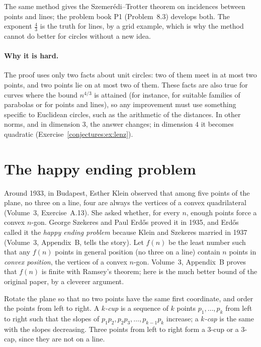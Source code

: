 The same method gives the Szemer\'edi--Trotter theorem on incidences between points and lines; the problem book P1 (Problem~8.3) develops both. The
exponent $\frac43$ is the truth for lines, by a grid example, which is why the method cannot do better for circles without a new idea.

\paragraph{Why it is hard.} The proof uses only two facts about unit circles: two of them meet in at most two points, and two points lie on at most two of
them. These facts are also true for curves where the bound $n^{4/3}$ is attained (for instance, for suitable families of parabolas or for points and
lines), so any improvement must use something specific to Euclidean circles, such as the arithmetic of the distances. In other norms, and in dimension
$3$, the answer changes; in dimension $4$ it becomes quadratic (Exercise~\ref{conjectures:ex:lenz}).

\section{The happy ending problem}

Around 1933, in Budapest, Esther Klein observed that among five points of the plane, no three on a line, four are always the vertices of a
convex quadrilateral (Volume~3, Exercise~A.13). She asked whether, for every $n$, enough points force a convex $n$-gon. George Szekeres and
Paul Erd\H os proved it in 1935, and Erd\H os called it the \emph{happy ending problem} because Klein and Szekeres married in 1937 (Volume~3, Appendix~B, tells the story). Let $f(n)$ be the least
number such that any $f(n)$ points in general position (no three on a line) contain $n$ points in \emph{convex position}, the vertices of a convex
$n$-gon. Volume~3, Appendix~B proves that $f(n)$ is finite with Ramsey's theorem; here is the much better bound of the original paper, by a cleverer argument.

Rotate the plane so that no two points have the same first coordinate, and order the points from left to right. A \emph{$k$-cup} is a sequence of $k$
points $p_1,\dots,p_k$ from left to right such that the slopes of $p_1p_2,p_2p_3,\dots,p_{k-1}p_k$ increase; a \emph{$k$-cap} is the same with the slopes
decreasing. Three points from left to right form a $3$-cup or a $3$-cap, since they are not on a line.

